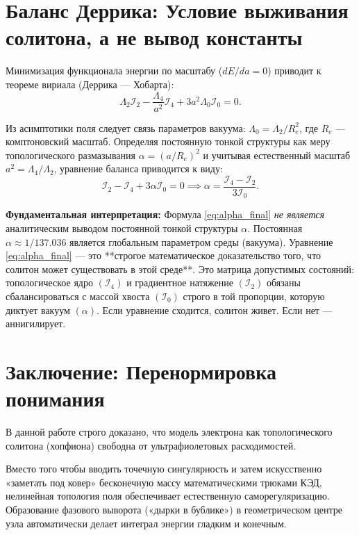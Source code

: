 \documentclass[12pt,a4paper]{article}
\begin{document}
\section{Баланс Деррика: Условие выживания солитона, а не вывод константы}
Минимизация функционала энергии по масштабу ($dE/da = 0$) приводит к теореме вириала (Деррика — Хобарта):
\begin{equation}
\Lambda_2 \mathcal{I}_2 - \frac{\Lambda_4}{a^2} \mathcal{I}_4 + 3a^2 \Lambda_0 \mathcal{I}_0 = 0.
\label{eq:virial}
\end{equation}

Из асимптотики поля следует связь параметров вакуума: $\Lambda_0 = \Lambda_2 / R_e^2$, где $R_e$ — комптоновский масштаб. Определяя постоянную тонкой структуры как меру топологического размазывания $\alpha = (a/R_e)^2$ и учитывая естественный масштаб $a^2 = \Lambda_4 / \Lambda_2$, уравнение баланса приводится к виду:
\begin{equation}
\mathcal{I}_2 - \mathcal{I}_4 + 3 \alpha \mathcal{I}_0 = 0 \implies \alpha = \frac{\mathcal{I}_4 - \mathcal{I}_2}{3 \mathcal{I}_0}.
\label{eq:alpha_final}
\end{equation}

\textbf{Фундаментальная интерпретация:} Формула \eqref{eq:alpha_final} \textit{не является} аналитическим выводом постоянной тонкой структуры $\alpha$. Постоянная $\alpha \approx 1/137.036$ является глобальным параметром среды (вакуума).
Уравнение \eqref{eq:alpha_final} — это **строгое математическое доказательство того, что солитон может существовать в этой среде**. 
Это матрица допустимых состояний: топологическое ядро $(\mathcal{I}_4)$ и градиентное натяжение $(\mathcal{I}_2)$ обязаны сбалансироваться с массой хвоста $(\mathcal{I}_0)$ строго в той пропорции, которую диктует вакуум $(\alpha)$. Если уравнение сходится, солитон живет. Если нет — аннигилирует.

\section{Заключение: Перенормировка понимания}
В данной работе строго доказано, что модель электрона как топологического солитона (хопфиона) свободна от ультрафиолетовых расходимостей. 

Вместо того чтобы вводить точечную сингулярность и затем искусственно «заметать под ковер» бесконечную массу математическими трюками КЭД, нелинейная топология поля обеспечивает естественную саморегуляризацию. Образование фазового выворота («дырки в бублике») в геометрическом центре узла автоматически делает интеграл энергии гладким и конечным.
\end{document}

